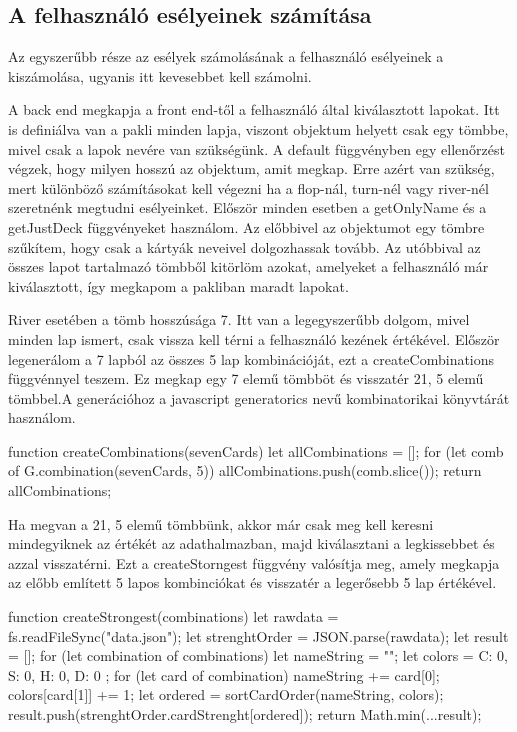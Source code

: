 \subsection{A felhasználó esélyeinek számítása}
Az egyszerűbb része az esélyek számolásának a felhasználó esélyeinek a kiszámolása, ugyanis itt kevesebbet kell számolni. 

A back end megkapja a front end-től a felhasználó által kiválasztott lapokat. Itt is definiálva van a pakli minden lapja, viszont objektum helyett csak egy tömbbe, mivel csak a lapok nevére van szükségünk. A default függvényben egy ellenőrzést végzek, hogy milyen hosszú az objektum, amit megkap. Erre azért van szükség, mert különböző számításokat kell végezni ha a flop-nál, turn-nél vagy river-nél szeretnénk megtudni esélyeinket. Először minden esetben a getOnlyName és a getJustDeck függvényeket használom. Az előbbivel az objektumot egy tömbre szűkítem, hogy csak a kártyák neveivel dolgozhassak tovább. Az utóbbival az összes lapot tartalmazó tömbből kitörlöm azokat, amelyeket a felhasználó már kiválasztott, így megkapom a pakliban maradt lapokat.

River esetében a tömb hosszúsága 7. Itt van a legegyszerűbb dolgom, mivel minden lap ismert, csak vissza kell térni a felhasználó kezének értékével. Először legenerálom a 7 lapból az összes 5 lap kombinációját, ezt a createCombinations függvénnyel teszem. Ez megkap egy 7 elemű tömbböt és visszatér 21, 5 elemű tömbbel.A generációhoz a javascript generatorics nevű kombinatorikai könyvtárát használom.

\begin{python}
function createCombinations(sevenCards) {
  let allCombinations = [];
  for (let comb of G.combination(sevenCards, 5)) {
    allCombinations.push(comb.slice());
  }
  return allCombinations;
}
\end{python}

Ha megvan a 21, 5 elemű tömbbünk, akkor már csak meg kell keresni mindegyiknek az értékét az adathalmazban, majd kiválasztani a legkissebbet és azzal visszatérni. Ezt a createStorngest függvény valósítja meg, amely megkapja az előbb említett 5 lapos kombinciókat és visszatér a legerősebb 5 lap értékével.

\begin{python}
function createStrongest(combinations){
  let rawdata = fs.readFileSync("data.json");
  let strenghtOrder = JSON.parse(rawdata);
  let result =  [];
  for (let combination of combinations) {
    let nameString = "";
    let colors = { C: 0, S: 0, H: 0, D: 0 };
    for (let card of combination) {
      nameString += card[0];
      colors[card[1]] += 1;
    }
    let ordered = sortCardOrder(nameString, colors);
    result.push(strenghtOrder.cardStrenght[ordered]);
  }
  return Math.min(...result);
}
\end{python}

